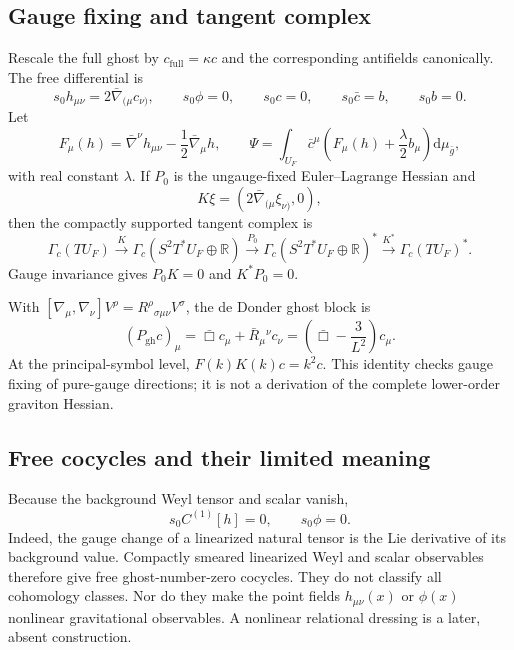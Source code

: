 \documentclass[11pt]{article}
\theoremstyle{definition}
\theoremstyle{remark}
\newcommand{\U}{U_{F}}
\newcommand{\gbar}{\bar g}
\newcommand{\cbar}{\bar c}
\newcommand{\dd}{\mathrm d}
\begin{document}
\subsection{Gauge fixing and tangent complex}

Rescale the full ghost by $c_{\mathrm{full}}=\kappa c$ and the corresponding antifields
canonically.  The free differential is
\begin{equation}
 s_0h_{\mu\nu}=2\bar\nabla_{(\mu}c_{\nu)},
 \qquad s_0\phi=0,
 \qquad s_0c=0,
 \qquad s_0\cbar=b,
 \qquad s_0b=0.
 \label{eq:s0}
\end{equation}
Let
\begin{equation}
 F_\mu(h)=\bar\nabla^\nu h_{\mu\nu}-\frac12\bar\nabla_\mu h,
 \qquad
 \Psi=\int_{\U}\cbar^\mu\left(F_\mu(h)+\frac{\lambda}{2}b_\mu\right)\dd\mu_{\gbar},
 \label{eq:gaugefermion}
\end{equation}
with real constant $\lambda$.  If $P_0$ is the ungauge-fixed Euler--Lagrange Hessian
and
\begin{equation}
 K\xi=(2\bar\nabla_{(\mu}\xi_{\nu)},0),
\end{equation}
then the compactly supported tangent complex is
\begin{equation}
 \Gamma_c(T\U)\xrightarrow{K}
 \Gamma_c(S^2T^*\U\oplus\mathbb R)
 \xrightarrow{P_0}
 \Gamma_c(S^2T^*\U\oplus\mathbb R)^*
 \xrightarrow{K^*}\Gamma_c(T\U)^*.
 \label{eq:tangentcomplex}
\end{equation}
Gauge invariance gives $P_0K=0$ and $K^*P_0=0$.

With $[\nabla_\mu,\nabla_\nu]V^\rho=R^\rho{}_{\sigma\mu\nu}V^\sigma$, the de
Donder ghost block is
\begin{equation}
 (P_{\mathrm{gh}}c)_\mu=\bar\Box c_\mu+\bar R_\mu{}^\nu c_\nu
 =\left(\bar\Box-\frac{3}{L^2}\right)c_\mu.
 \label{eq:ghostP}
\end{equation}
At the principal-symbol level, $F(k)K(k)c=k^2c$.  This identity checks gauge fixing
of pure-gauge directions; it is not a derivation of the complete lower-order graviton
Hessian.

\subsection{Free cocycles and their limited meaning}

Because the background Weyl tensor and scalar vanish,
\begin{equation}
 s_0C^{(1)}[h]=0,
 \qquad s_0\phi=0.
\end{equation}
Indeed, the gauge change of a linearized natural tensor is the Lie derivative of its
background value.  Compactly smeared linearized Weyl and scalar observables therefore
give free ghost-number-zero cocycles.  They do not classify all cohomology classes.
Nor do they make the point fields $h_{\mu\nu}(x)$ or $\phi(x)$ nonlinear gravitational
observables.  A nonlinear relational dressing is a later, absent construction.
\end{document}
